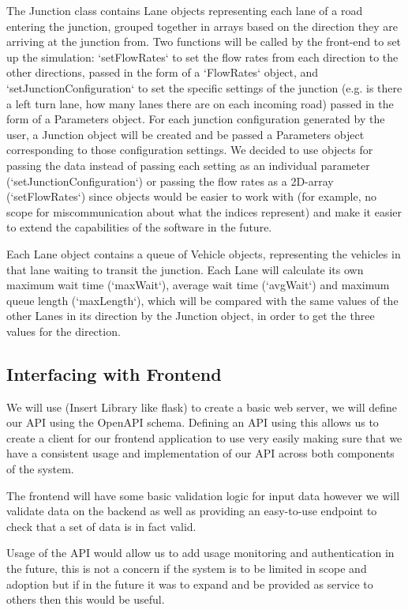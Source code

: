 \documentclass{article}
\begin{document}
The Junction class contains Lane objects representing each lane of a road entering the junction, grouped together in arrays based on 
the direction they are arriving at the junction from. Two functions will be called by the front-end to set up the simulation: `setFlowRates` 
to set the flow rates from each direction to the other directions, passed in the form of a `FlowRates` object, and `setJunctionConfiguration` 
to set the specific settings of the junction (e.g. is there a left turn lane, how many lanes there are on each incoming road) passed in 
the form of a Parameters object. For each junction configuration generated by the user, a Junction object will be created and be passed 
a Parameters object corresponding to those configuration settings. We decided to use objects for passing the data instead of passing each 
setting as an individual parameter (`setJunctionConfiguration`) or passing the flow rates as a 2D-array (`setFlowRates`) since objects would 
be easier to work with (for example, no scope for miscommunication about what the indices represent) and make it easier to extend the 
capabilities of the software in the future.

Each Lane object contains a queue of Vehicle objects, representing the vehicles in that lane waiting to transit the junction. Each Lane 
will calculate its own maximum wait time (`maxWait`), average wait time (`avgWait`) and maximum queue length (`maxLength`), which will be 
compared with the same values of the other Lanes in its direction by the Junction object, in order to get the three values for the direction.

\subsection{Interfacing with Frontend}

We will use (Insert Library like flask) to create a basic web server, we will define 
our API using the OpenAPI schema. Defining an API using this allows us to create a 
client for our frontend application to use very easily making sure that we have a 
consistent usage and implementation of our API across both components of the system. 

The frontend will have some basic validation logic for input data however we will  
validate data on the backend as well as providing an easy-to-use endpoint to check that 
a set of data is in fact valid. 

Usage of the API would allow us to add usage monitoring and authentication in the future, 
this is not a concern if the system is to be limited in scope and adoption but if in the 
future it was to expand and be provided as service to others then this would be useful.
\end{document}
